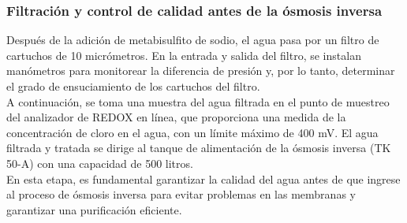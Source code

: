 \subsubsection{Filtración y control de calidad antes de la ósmosis inversa}

Después de la adición de metabisulfito de sodio, el agua pasa por un filtro de cartuchos de 10 micrómetros. En la entrada y salida del filtro,
se instalan manómetros para monitorear la diferencia de presión y, por lo tanto, determinar el grado de ensuciamiento de los cartuchos del filtro.\\

A continuación, se toma una muestra del agua filtrada en el punto de muestreo del analizador de REDOX en línea, que proporciona una medida de
la concentración de cloro en el agua, con un límite máximo de 400 mV. El agua filtrada y tratada se dirige al tanque de alimentación de la ósmosis
inversa (TK 50-A) con una capacidad de 500 litros. \\

En esta etapa, es fundamental garantizar la calidad del agua antes de que ingrese al proceso de ósmosis inversa para evitar problemas en las
membranas y garantizar una purificación eficiente. \\
